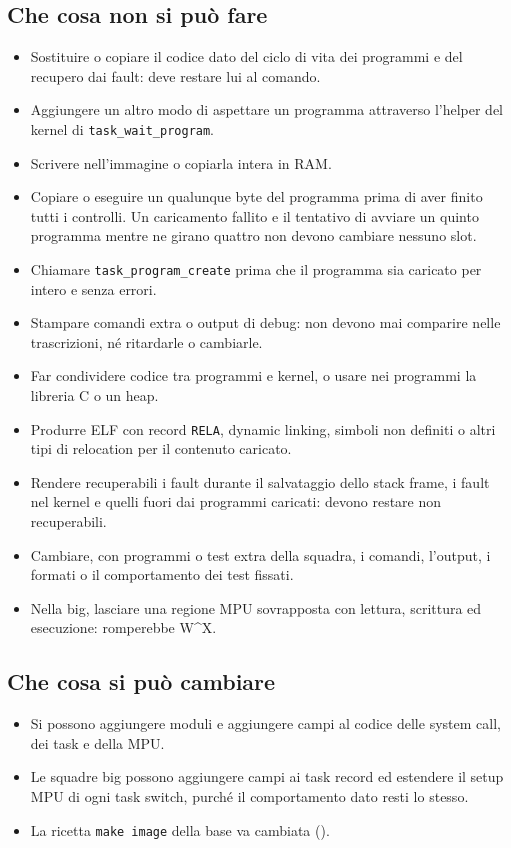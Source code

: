 \subsection{Che cosa non si può fare}
\begin{itemize}\sloppy
\item Sostituire o copiare il codice dato del ciclo di vita dei programmi e del recupero dai fault: deve restare lui al comando.
\item Aggiungere un altro modo di aspettare un programma attraverso l'helper del kernel di \texttt{task\_wait\_program}.
\item Scrivere nell'immagine o copiarla intera in RAM.
\item Copiare o eseguire un qualunque byte del programma prima di aver finito tutti i controlli. Un caricamento fallito e il tentativo di avviare un quinto programma mentre ne girano quattro non devono cambiare nessuno slot.
\item Chiamare \texttt{task\_program\_create} prima che il programma sia caricato per intero e senza errori.
\item Stampare comandi extra o output di debug: non devono mai comparire nelle trascrizioni, né ritardarle o cambiarle.
\item Far condividere codice tra programmi e kernel, o usare nei programmi la libreria C o un heap.
\item Produrre ELF con record \texttt{RELA}, dynamic linking, simboli non definiti o altri tipi di relocation per il contenuto caricato.
\item Rendere recuperabili i fault durante il salvataggio dello stack frame, i fault nel kernel e quelli fuori dai programmi caricati: devono restare non recuperabili.
\item Cambiare, con programmi o test extra della squadra, i comandi, l'output, i formati o il comportamento dei test fissati.
\item Nella big, lasciare una regione MPU sovrapposta con lettura, scrittura ed esecuzione: romperebbe W\textasciicircum{}X.
\end{itemize}

\subsection{Che cosa si può cambiare}
\begin{itemize}\sloppy
\item Si possono aggiungere moduli e aggiungere campi al codice delle system call, dei task e della MPU.
\item Le squadre big possono aggiungere campi ai task record ed estendere il setup MPU di ogni task switch, purché il comportamento dato resti lo stesso.
\item La ricetta \texttt{make image} della base va cambiata ().
\end{itemize}

